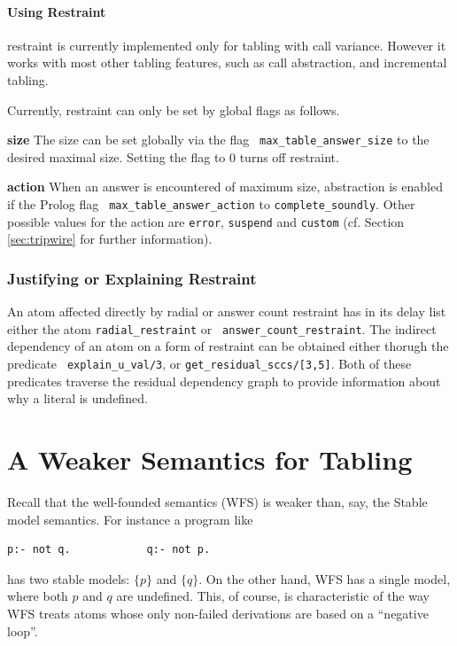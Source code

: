 \paragraph*{Using \MAXANS{} Restraint}
\Maxans{} restraint is currently implemented only for tabling with call
variance.  However it works with most other tabling features, such as
call abstraction, and incremental tabling.

Currently, \maxans{} restraint can only be set by global flags as
follows.
\bi
\item {\bf size} The size can be set globally via the flag {\tt
  max\_table\_answer\_size} to the desired maximal size.  Setting the
  flag to 0 turns off \maxans{} restraint.

\item {\bf action} When an answer is encountered of maximum size,
  abstraction is enabled if the Prolog flag {\tt
    max\_table\_answer\_action} to {\tt complete\_soundly}.  Other
  possible values for the action are {\tt error}, {\tt suspend} and {\tt custom}
  (cf. Section \ref{sec:tripwire} for further information).  \ei

\subsubsection{Justifying or Explaining Restraint}

An atom affected directly by radial or answer count restraint has in
its delay list either the atom {\tt radial\_restraint} or {\tt
  answer\_count\_restraint}.  The indirect dependency of an atom on a
form of restraint can be obtained either thorugh the predicate {\tt
  explain\_u\_val/3}, or {\tt get\_residual\_sccs/[3,5]}.  Both of
these predicates traverse the residual dependency graph to provide
information about why a literal is undefined.




\section{A Weaker Semantics for Tabling}
%
Recall that the well-founded semantics (WFS) is weaker than, say,
the Stable model semantics.  For instance a program like
%
\begin{verbatim}
p:- not q.            q:- not p.
\end{verbatim}
%
has two stable models: $\{p\}$ and $\{q\}$.  On the other hand, WFS
has a single model, where both $p$ and $q$ are undefined.  This, of
course, is characteristic of the way WFS treats atoms whose only
non-failed derivations are based on a ``negative loop''.

